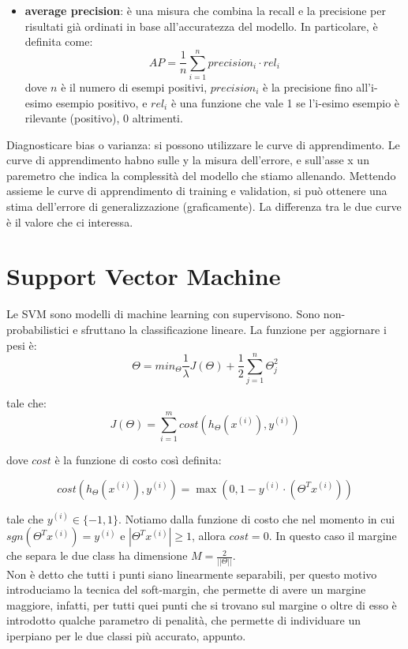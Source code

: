 \documentclass{article}
\begin{document}
\begin{itemize}
	\item \textbf{average precision}: è una misura che combina la recall e la
		precisione per risultati già ordinati in base all'accuratezza del
		modello. In particolare, è definita come:
		\begin{equation}
			AP = \frac{1}{n} \sum_{i=1}^{n} precision_i \cdot rel_i
		\end{equation}
		dove $n$ è il numero di esempi positivi, $precision_i$ è la precisione
		fino all'i-esimo esempio positivo, e $rel_i$ è una funzione che vale 1
		se l'i-esimo esempio è rilevante (positivo), 0 altrimenti.
\end{itemize}

Diagnosticare bias o varianza: si possono utilizzare le curve di apprendimento.
Le curve di apprendimento habno sulle y la misura dell'errore, e sull'asse x un
paremetro che indica la complessità del modello che stiamo allenando.
Mettendo assieme le curve di apprendimento di training e validation, si può
ottenere una stima dell'errore di generalizzazione (graficamente). La differenza
tra le due curve è il valore che ci interessa.

\section{Support Vector Machine}
Le SVM sono modelli di machine learning con supervisono. Sono non-probabilistici
e sfruttano la classificazione lineare. La funzione per aggiornare i pesi è:
\begin{equation}
	\Theta = min_{\Theta} \frac{1}{\lambda} J(\Theta) + 
	\frac{1}{2} \sum_{j=1}^{n} \Theta_j^2
\end{equation}

tale che:
\begin{equation}
	J(\Theta) = \sum_{i=1}^{m} cost(h_{\Theta}(x^{(i)}), y^{(i)})
\end{equation}

dove $cost$ è la funzione di costo così definita:

\begin{equation}
	cost(h_{\Theta}(x^{(i)}), y^{(i)}) = \max(0, 1 - y^{(i)} \cdot (\Theta^T x^{(i)}))
\end{equation}

tale che $y^{(i)} \in \{-1, 1\}$. Notiamo dalla funzione di costo che nel
momento in cui $sgn(\Theta^T x^{(i)}) = y^{(i)}$ e $|\Theta^T x^{(i)}| \geq 1$,
allora $cost = 0$. In questo caso il margine che separa le due class ha
dimensione $M = \frac{2}{||\Theta||}$. \\
Non è detto che tutti i punti siano linearmente separabili, per questo motivo
introduciamo la tecnica del soft-margin, che permette di avere un margine
maggiore, infatti, per tutti quei punti che si trovano sul margine o oltre di
esso è introdotto qualche parametro di penalità, che permette di individuare un
iperpiano per le due classi più accurato, appunto. \\
\end{document}
